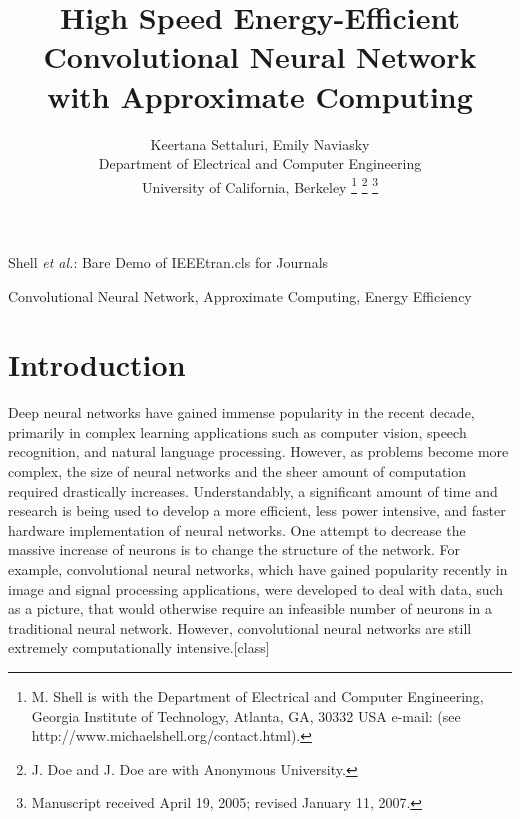 \documentclass[journal]{IEEEtran}
\begin{document}
%
\title{High Speed Energy-Efficient Convolutional Neural Network with Approximate Computing}

\author{Keertana Settaluri,
        Emily Naviasky\\%
        Department of Electrical and Computer Engineering\\
        University of California, Berkeley
\thanks{M. Shell is with the Department
of Electrical and Computer Engineering, Georgia Institute of Technology, Atlanta,
GA, 30332 USA e-mail: (see http://www.michaelshell.org/contact.html).}%
\thanks{J. Doe and J. Doe are with Anonymous University.}%
\thanks{Manuscript received April 19, 2005; revised January 11, 2007.}}

%
{Shell \MakeLowercase{\textit{et al.}}: Bare Demo of IEEEtran.cls for Journals}

\maketitle


\begin{abstract}
\blindtext[1]
\end{abstract}

\begin{IEEEkeywords}
Convolutional Neural Network, Approximate Computing, Energy Efficiency
\end{IEEEkeywords}

\IEEEpeerreviewmaketitle

\section{Introduction}
\indent Deep neural networks have gained immense popularity in the recent decade, primarily in complex learning applications such as computer vision, speech recognition, and natural language processing. However, as problems become more complex, the size of neural networks and the sheer amount of computation required drastically increases. Understandably, a significant amount of time and research is being used to develop a more efficient, less power intensive, and faster hardware implementation of neural networks. One attempt to decrease the massive increase of neurons is to change the structure of the network. For example, convolutional neural networks, which have gained popularity recently in image and signal processing applications, were developed to deal with data, such as a picture, that would otherwise require an infeasible number of neurons in a traditional neural network. However, convolutional neural networks are still extremely computationally intensive.[class] \\
	
\end{document}

